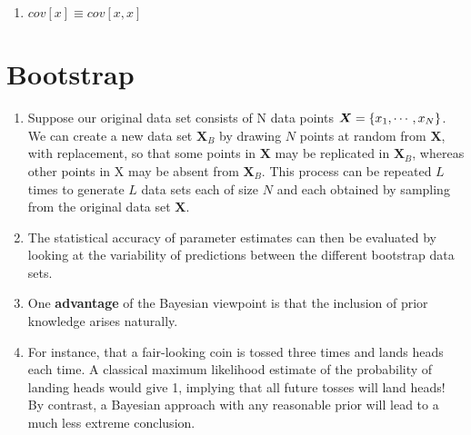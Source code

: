 \begin{multicols}{2}
\begin{enumerate}[series=rvrules]
    \item $ cov[x] \equiv cov[x,x] $
    \hfill \cite{ml/book/Pattern-Recognition-And-Machine-Learning/Christopher-M-Bishop}
\end{enumerate}
\end{multicols}






\section{Bootstrap}


\begin{enumerate}
    \item Suppose our original data set consists of N data points $\bm{X} = \left\{x_1, \cdots , x_N \right\}$.
    We can create a new data set $\bm{X}_B$ by drawing $N$ points at random from $\bm{X}$, with replacement, so that some points in $\bm{X}$ may be replicated in $\bm{X}_B$, whereas other points in X may be absent from $\bm{X}_B$.
    This process can be repeated $L$ times to generate $L$ data sets each of size $N$ and each obtained by sampling from the original data set $\bm{X}$.
    \hfill \cite{ml/book/Pattern-Recognition-And-Machine-Learning/Christopher-M-Bishop}

    \item The statistical accuracy of parameter estimates can then be evaluated by looking at the variability of predictions between the different bootstrap data sets.
    \hfill \cite{ml/book/Pattern-Recognition-And-Machine-Learning/Christopher-M-Bishop}

    \item One \textbf{advantage} of the Bayesian viewpoint is that the inclusion of prior knowledge arises naturally.
    \hfill \cite{ml/book/Pattern-Recognition-And-Machine-Learning/Christopher-M-Bishop}

    \item For instance, that a fair-looking coin is tossed three times and lands heads each time.
    A classical maximum likelihood estimate of the probability of landing heads would give 1, implying that all future tosses will land heads!
    By contrast, a Bayesian approach with any reasonable prior will lead to a much less extreme conclusion.
    \hfill \cite{ml/book/Pattern-Recognition-And-Machine-Learning/Christopher-M-Bishop}


\end{enumerate}











